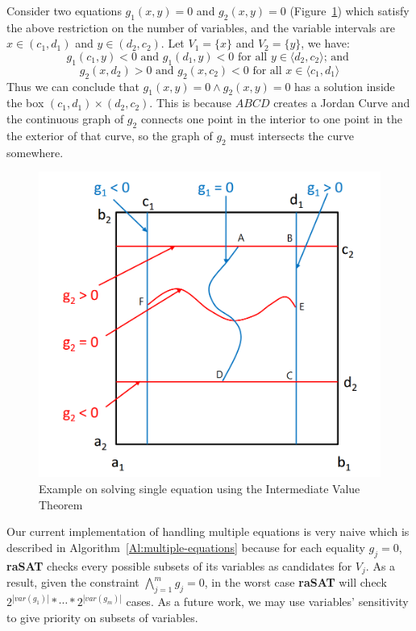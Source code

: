 \documentclass[runningheads,a4paper,oribibl]{llncs}
\begin{document}
\begin{example}
Consider two equations $g_1(x, y)=0$ and $g_2(x, y) = 0$ (Figure~\ref{fig:multiple-equations}) which satisfy the above restriction on the number of variables, and the variable intervals are $x \in (c_1, d_1)$ and $y \in(d_2, c_2)$. Let $V_1 = \{x\}$ and $V_2 = \{y\}$, we have:
\[g_1(c_1, y) < 0\text{ and }g_1(d_1, y) < 0 \text{ for all } y \in \langle d_2, c_2 \rangle \text{; and }\]
\[g_2(x, d_2) > 0 \text{ and }g_2(x, c_2) < 0 \text{ for all } x \in \langle c_1, d_1 \rangle\]
Thus we can conclude that $g_1(x,y)=0 \wedge g_2(x,y)=0$ has a solution inside the box $(c_1, d_1) \times (d_2, c_2)$. This is because $ABCD$ creates a Jordan Curve and the continuous graph of $g_2$ connects one point in the interior to one point in the the exterior of that curve, so the graph of $g_2$ must intersects the curve somewhere.
\end{example}
\begin{figure}[ht]
\centering
\includegraphics[scale=0.4]{multipleEquations.png} 
\caption{Example on solving single equation using the Intermediate Value Theorem} 
\label{fig:multiple-equations} 
\end{figure}
Our current implementation of handling multiple equations is very naive
which is described in Algorithm~\ref{Al:multiple-equations}
because for each equality $g_j = 0$, \textbf{raSAT} checks every possible subsets of its variables as candidates for $V_j$. As a result, given the constraint $\bigwedge\limits_{j=1}^mg_j=0$, in the worst case \textbf{raSAT} will check $2^{|var(g_1)|}*\cdots*2^{|var(g_m)|}$ cases. As a future work, we may use variables' sensitivity to give priority on subsets of variables.
\end{document}
